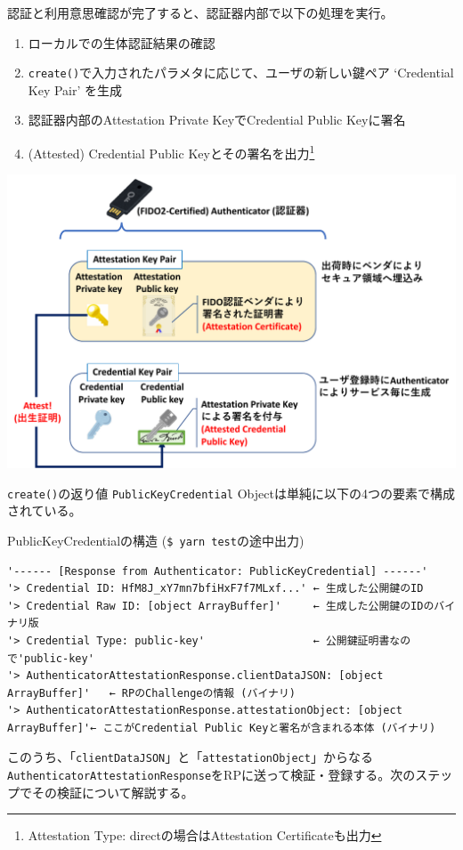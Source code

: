 \documentclass[12pt,dvipdfmx,uplatex]{beamer}
\begin{document}
\begin{frame}
\small
認証と利用意思確認が完了すると、認証器内部で以下の処理を実行。
\begin{enumerate}
\setlength{\itemsep}{0ex}
 \item ローカルでの生体認証結果の確認
 \item \texttt{create()}で入力されたパラメタに応じて、ユーザの新しい鍵ペア `Credential Key Pair' を生成
 \item 認証器内部のAttestation Private KeyでCredential Public Keyに署名
 \item (Attested) Credential Public Keyとその署名を出力\footnote[frame]{\scriptsize Attestation Type: directの場合はAttestation Certificateも出力}
\end{enumerate}
\begin{center}
\includegraphics[width=0.6\linewidth]{Figs/webauthn-attestation.pdf}
\end{center}
\end{frame}

\begin{frame}[fragile]
\small
\texttt{create()}の返り値 \texttt{PublicKeyCredential} Objectは単純に以下の4つの要素で構成されている。
\begin{exampleblock}{\scriptsize PublicKeyCredentialの構造 (\texttt{\$ yarn test}の途中出力)}
{\tiny
\begin{verbatim}
'------ [Response from Authenticator: PublicKeyCredential] ------'
'> Credential ID: HfM8J_xY7mn7bfiHxF7f7MLxf...' ← 生成した公開鍵のID
'> Credential Raw ID: [object ArrayBuffer]'     ← 生成した公開鍵のIDのバイナリ版
'> Credential Type: public-key'                 ← 公開鍵証明書なので'public-key'
'> AuthenticatorAttestationResponse.clientDataJSON: [object ArrayBuffer]'   ← RPのChallengeの情報 (バイナリ)
'> AuthenticatorAttestationResponse.attestationObject: [object ArrayBuffer]'← ここがCredential Public Keyと署名が含まれる本体 (バイナリ)
\end{verbatim}
}
\end{exampleblock}

このうち、「\texttt{clientDataJSON}」と「\texttt{attestationObject}」からなる\texttt{AuthenticatorAttestationResponse}をRPに送って検証・登録する。次のステップでその検証について解説する。


\end{frame}
\end{document}
